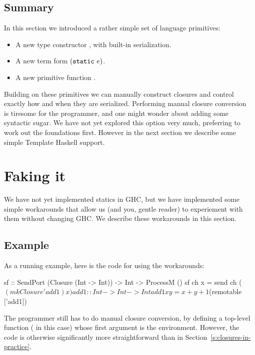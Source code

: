 \documentclass[preprint]{sigplanconf}
\begin{document}
\subsection{Summary}

In this section we introduced a rather simple set of language primitives:
\begin{itemize}
\item A new type constructor , with built-in serialization.
\item A new term form $(\text{\tt static}~e)$.
\item A new primitive function .
\end{itemize}
Building on these primitives we can manually construct closures and
control exactly how and when they are serialized.
Performing manual closure conversion is tiresome for the programmer,
and one might wonder about adding some syntactic sugar.
We have not yet explored this option very much, preferring to work out the
foundations first.
However in the next section we describe some simple Template Haskell support.



\section{Faking it}

We have not yet implemented statics in GHC, but we have implemented
some simple workarounds that allow us (and you, gentle reader) to experiement
with them without changing GHC.  We describe these workarounds in this section.

\subsection{Example}
As a running example, here is the code for  using the workarounds:
\begin{code}
  sf :: SendPort (Closure (Int -> Int)) 
     -> Int -> ProcessM ()
  sf ch x = send ch ($(mkClosure 'add1) x)

  add1 :: Int -> Int -> Int
  add1 x y = x + y + 1

  $(remotable ['add1])
\end{code}
The programmer still has to do manual closure conversion, by defining
a top-level function ( in this case) whose first argument is
the environment.  However, the code is otherwise significantly more 
straightforward than in Section~\ref{s:closures-in-practice}.
\end{document}
